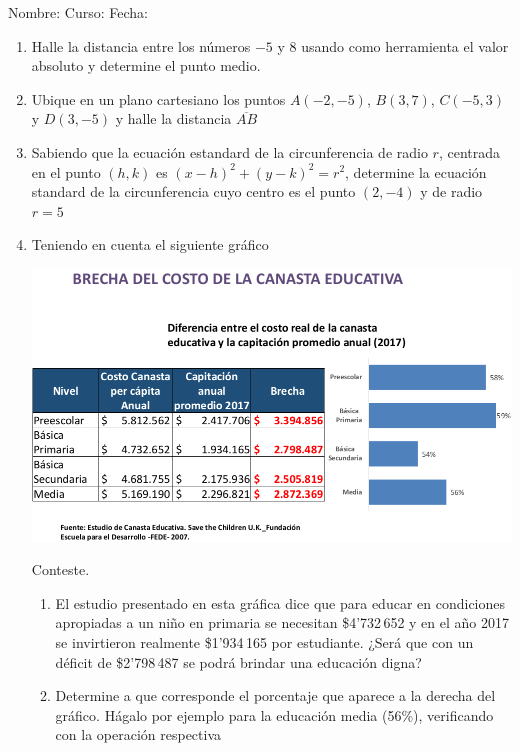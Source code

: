 \documentclass[fleqn]{article}
\newcommand{\LineaNombre}{%
\par
\vspace{\baselineskip}
Nombre:\hrulefill \; Curso: \underline{\hspace*{48pt}} \; Fecha: \underline{\hspace*{2.5cm}} \relax
\par}
\begin{document}
\LineaNombre
\begin{enumerate}
 \item Halle la distancia entre los números $-5$ y 8 usando como herramienta el valor absoluto y determine el punto medio.\noanswer
 \item Ubique en un plano cartesiano los puntos $A(-2,-5)$, $B(3,7)$, $C(-5,3)$ y $D(3,-5)$ y halle la distancia $\overline{AB}$
  \item Sabiendo que la ecuación estandard de la circunferencia de radio $r$, centrada en el punto $(h,k)$ es $(x-h)^{2}+(y-k)^{2}=r^{2}$, determine la ecuación standard de la circunferencia cuyo centro es el punto $(2,-4)$ y de radio $r=5$ \noanswer
 \item Teniendo en cuenta el siguiente gráfico
 \begin{center}
 \includegraphics[scale=.375]{Images/BrechaCanasta.png} 
 \end{center}
 Conteste.
 \begin{enumerate}
 \item El estudio presentado en esta gráfica dice que para educar en condiciones apropiadas a un niño en primaria se necesitan \$4'732\,652 y en el año 2017 se invirtieron realmente \$1'934\,165 por estudiante. ¿Será que con un déficit de \$2'798\,487 se podrá brindar una educación digna?
 \item Determine a que corresponde el porcentaje que aparece a la derecha del gráfico. Hágalo por ejemplo para la educación media (56\%), verificando con la operación respectiva \noanswer

\end{enumerate}
\end{enumerate}
\end{document}
